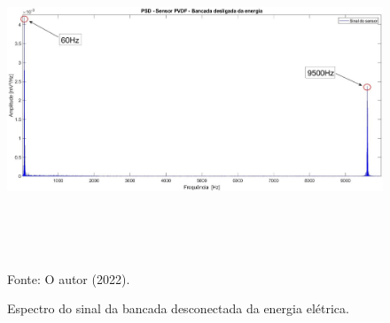 \documentclass[
	12pt,				
	oneside,			
	a4paper,			
	english,			
	brazil,	
	sumario=abnt-6027-2012		
	]{abntex2ppgsi}
\begin{document}
\begin{figure}[H]
\centering
\caption {Espectro do sinal da bancada desconectada da energia elétrica.}
\includegraphics[width=\textwidth,height=100mm,keepaspectratio]{PSD_PVDF_MAQUINA_DESLIGADA} \\
Fonte: O autor (2022).
\label{PSD_SENSOR_MAQUINA_DESLIGADA}
\end{figure} 
\end{document}
